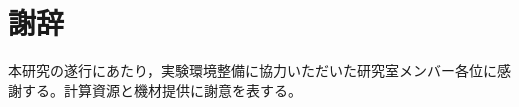 \documentclass[a4paper,11pt]{ltjsreport}
\begin{document}
\chapter*{謝辞}
本研究の遂行にあたり，実験環境整備に協力いただいた研究室メンバー各位に感謝する。計算資源と機材提供に謝意を表する。




\end{document}
